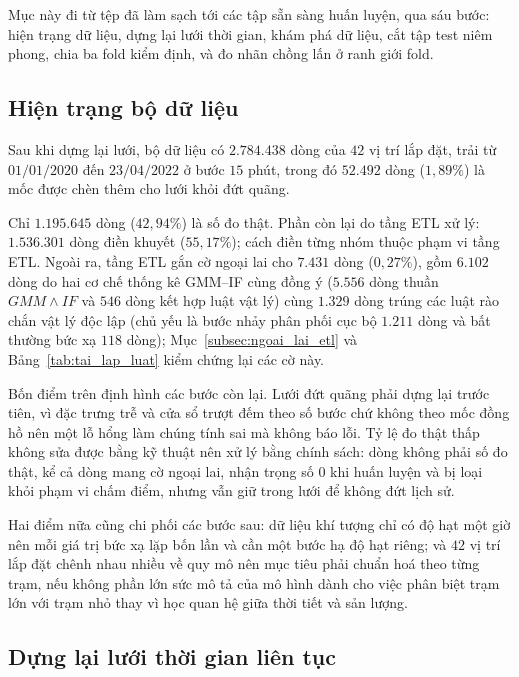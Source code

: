 \documentclass[12pt, a4paper]{report}
\begin{document}
Mục này đi từ tệp đã làm sạch tới các tập sẵn sàng huấn luyện, qua sáu bước: hiện trạng dữ
liệu, dựng lại lưới thời gian, khám phá dữ liệu, cắt tập test niêm phong, chia ba fold kiểm
định, và đo nhãn chồng lấn ở ranh giới fold.

\FloatBarrier
\subsection{Hiện trạng bộ dữ liệu}
\label{subsec:hien_trang_du_lieu}

Sau khi dựng lại lưới, bộ dữ liệu có $2.784.438$ dòng của $42$ vị trí lắp đặt, trải từ
$01/01/2020$ đến $23/04/2022$ ở bước $15$ phút, trong đó $52.492$ dòng ($1{,}89\%$) là mốc
được chèn thêm cho lưới khỏi đứt quãng.

Chỉ $1.195.645$ dòng ($42{,}94\%$) là số đo thật. Phần còn lại do tầng ETL xử lý: $1.536.301$
dòng điền khuyết ($55{,}17\%$); cách điền từng nhóm thuộc phạm vi tầng ETL. Ngoài ra, tầng ETL gắn cờ ngoại lai cho $7.431$ dòng ($0{,}27\%$), gồm $6.102$ dòng do hai cơ chế thống kê GMM--IF cùng đồng ý ($5.556$ dòng thuần $GMM \wedge IF$ và $546$ dòng kết hợp luật vật lý) cùng $1.329$ dòng trúng các luật rào chắn vật lý độc lập (chủ yếu là bước nhảy phân phối cục bộ $1.211$ dòng và bất thường bức xạ $118$ dòng); Mục~\ref{subsec:ngoai_lai_etl} và Bảng~\ref{tab:tai_lap_luat} kiểm chứng lại các cờ này.

Bốn điểm trên định hình các bước còn lại. Lưới đứt quãng phải dựng lại trước tiên, vì đặc
trưng trễ và cửa sổ trượt đếm theo số bước chứ không theo mốc đồng hồ nên một lỗ hổng làm chúng
tính sai mà không báo lỗi. Tỷ lệ đo thật thấp không sửa được bằng kỹ thuật nên xử lý bằng chính
sách: dòng không phải số đo thật, kể cả dòng mang cờ ngoại lai, nhận trọng số $0$ khi huấn luyện
và bị loại khỏi phạm vi chấm điểm, nhưng vẫn giữ trong lưới để không đứt lịch sử.

Hai điểm nữa cũng chi phối các bước sau: dữ liệu khí tượng chỉ có độ hạt một giờ nên mỗi giá trị
bức xạ lặp bốn lần và cần một bước hạ độ hạt riêng; và $42$ vị trí lắp đặt chênh nhau nhiều về
quy mô nên mục tiêu phải chuẩn hoá theo từng trạm, nếu không phần lớn sức mô tả của mô hình dành cho việc phân biệt trạm
lớn với trạm nhỏ thay vì học quan hệ giữa thời tiết và sản lượng.

\FloatBarrier
\subsection{Dựng lại lưới thời gian liên tục}
\end{document}
